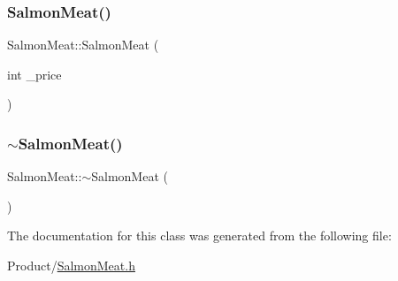 \mbox{\label{classSalmonMeat_abe2800e9175a43d2080f06e906207c93}} 
\subsubsection{\texorpdfstring{SalmonMeat()}{SalmonMeat()}\hspace{0.1cm}{\footnotesize\ttfamily [2/2]}}
{\footnotesize\ttfamily Salmon\+Meat\+::\+Salmon\+Meat (\begin{DoxyParamCaption}\item[{int}]{\+\_\+price }\end{DoxyParamCaption})}

\mbox{\label{classSalmonMeat_aeb95f128cc2f8266843f15c0b78612bd}} 
\subsubsection{\texorpdfstring{$\sim$SalmonMeat()}{~SalmonMeat()}}
{\footnotesize\ttfamily Salmon\+Meat\+::$\sim$\+Salmon\+Meat (\begin{DoxyParamCaption}{ }\end{DoxyParamCaption})}



The documentation for this class was generated from the following file\+:\begin{DoxyCompactItemize}
\item 
Product/\mbox{\hyperlink{SalmonMeat_8h}{Salmon\+Meat.\+h}}\end{DoxyCompactItemize}
